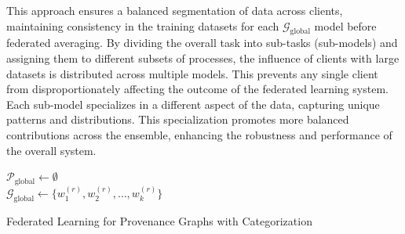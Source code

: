 This approach ensures a balanced segmentation of data across clients, maintaining consistency in the training datasets for each \( \mathcal{G}_{\text{global}} \) model before federated averaging. By dividing the overall task into sub-tasks (sub-models) and assigning them to different subsets of processes, the influence of clients with large datasets is distributed across multiple models. This prevents any single client from disproportionately affecting the outcome of the federated learning system. Each sub-model specializes in a different aspect of the data, capturing unique patterns and distributions. This specialization promotes more balanced contributions across the ensemble, enhancing the robustness and performance of the overall system.


\begin{algorithm}[!t]
  \scriptsize
  \DontPrintSemicolon
  \BlankLine
  $\mathcal{P}_{\text{global}} \leftarrow \emptyset$\\
  \BlankLine
  \BlankLine
  \BlankLine
  \BlankLine
  \BlankLine
  \Return $\mathcal{G}_{\text{global}} \leftarrow \{w_1^{(r)}, w_2^{(r)}, \ldots, w_k^{(r)}\}$\\
  \BlankLine
  \caption{Federated Learning for Provenance Graphs with Categorization}
  \label{alg:federated_provenance}
  \end{algorithm}  

